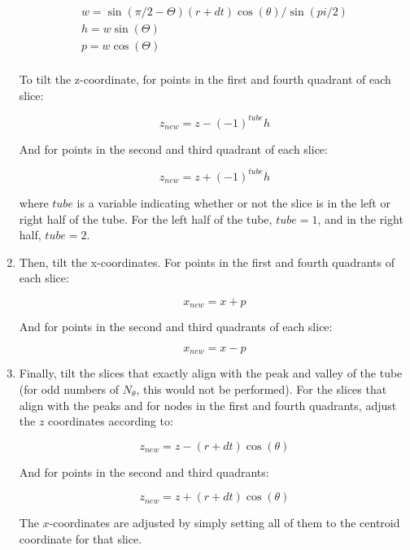 \documentclass[10pt]{article}
\begin{document}
\begin{enumerate}
\begin{equation}
\begin{aligned}
w=\sin{(\pi/2-\Theta)}(r+dt)\cos{(\theta)}/\sin{(pi/2)}\\
h = w\sin{(\Theta)}\\
p = w\cos{(\Theta)}\\
\end{aligned}
\end{equation}

To tilt the z-coordinate, for points in the first and fourth quadrant of each slice:

\begin{equation}
z_{new} = z - (-1)^{tube}h
\end{equation}

And for points in the second and third quadrant of each slice:

\begin{equation}
z_{new} = z + (-1)^{tube}h
\end{equation}

where \(tube\) is a variable indicating whether or not the slice is in the left or right half of the tube. For the left half of the tube, \(tube=1\), and in the right half, \(tube=2\).

\item Then, tilt the x-coordinates. For points in the first and fourth quadrants of each slice:

\begin{equation}
x_{new} = x + p
\end{equation}

And for points in the second and third quadrants of each slice:

\begin{equation}
x_{new} = x - p
\end{equation}

\item Finally, tilt the slices that exactly align with the peak and valley of the tube (for odd numbers of \(N_\theta\), this would not be performed). For the slices that align with the peaks and for nodes in the first and fourth quadrants, adjust the \(z\) coordinates according to:

\begin{equation}
z_{new} = z - (r+dt)\cos{(\theta)}
\end{equation}

And for points in the second and third quadrants:

\begin{equation}
z_{new} = z + (r+dt)\cos{(\theta)}
\end{equation}

The \(x\)-coordinates are adjusted by simply setting all of them to the centroid coordinate for that slice. 
\end{enumerate}
\end{document}
